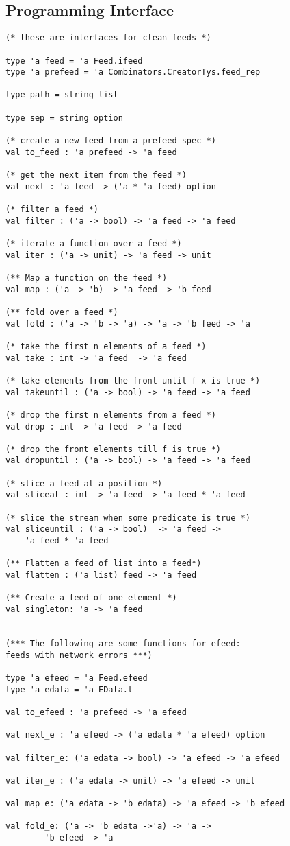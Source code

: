 
\subsection{Programming Interface}
{\small 
\begin{verbatim}
(* these are interfaces for clean feeds *)

type 'a feed = 'a Feed.ifeed
type 'a prefeed = 'a Combinators.CreatorTys.feed_rep

type path = string list

type sep = string option

(* create a new feed from a prefeed spec *)
val to_feed : 'a prefeed -> 'a feed

(* get the next item from the feed *)
val next : 'a feed -> ('a * 'a feed) option

(* filter a feed *)
val filter : ('a -> bool) -> 'a feed -> 'a feed

(* iterate a function over a feed *)
val iter : ('a -> unit) -> 'a feed -> unit

(** Map a function on the feed *)
val map : ('a -> 'b) -> 'a feed -> 'b feed

(** fold over a feed *)
val fold : ('a -> 'b -> 'a) -> 'a -> 'b feed -> 'a

(* take the first n elements of a feed *)
val take : int -> 'a feed  -> 'a feed

(* take elements from the front until f x is true *)
val takeuntil : ('a -> bool) -> 'a feed -> 'a feed

(* drop the first n elements from a feed *)
val drop : int -> 'a feed -> 'a feed

(* drop the front elements till f is true *)
val dropuntil : ('a -> bool) -> 'a feed -> 'a feed 

(* slice a feed at a position *)
val sliceat : int -> 'a feed -> 'a feed * 'a feed

(* slice the stream when some predicate is true *)
val sliceuntil : ('a -> bool)  -> 'a feed -> 
	'a feed * 'a feed

(** Flatten a feed of list into a feed*)
val flatten : ('a list) feed -> 'a feed

(** Create a feed of one element *)
val singleton: 'a -> 'a feed


(*** The following are some functions for efeed: 
feeds with network errors ***)

type 'a efeed = 'a Feed.efeed
type 'a edata = 'a EData.t

val to_efeed : 'a prefeed -> 'a efeed

val next_e : 'a efeed -> ('a edata * 'a efeed) option

val filter_e: ('a edata -> bool) -> 'a efeed -> 'a efeed

val iter_e : ('a edata -> unit) -> 'a efeed -> unit

val map_e: ('a edata -> 'b edata) -> 'a efeed -> 'b efeed

val fold_e: ('a -> 'b edata ->'a) -> 'a -> 
		'b efeed -> 'a
\end{verbatim}
}

